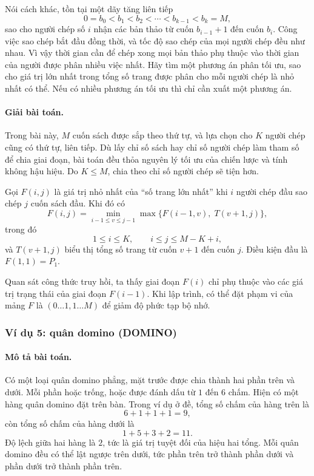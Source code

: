 \documentclass[11pt]{article}
\begin{document}
Nói cách khác, tồn tại một dãy tăng liên tiếp
\[
  0=b_0<b_1<b_2<\cdots<b_{k-1}<b_k=M,
\]
sao cho người chép số $i$ nhận các bản thảo từ cuốn $b_{i-1}+1$ đến cuốn
$b_i$. Công việc sao chép bắt đầu đồng thời, và tốc độ sao chép của mọi người
chép đều như nhau. Vì vậy thời gian cần để chép xong mọi bản thảo phụ thuộc
vào thời gian của người được phân nhiều việc nhất. Hãy tìm một phương án phân
tối ưu, sao cho giá trị lớn nhất trong tổng số trang được phân cho mỗi người
chép là nhỏ nhất có thể. Nếu có nhiều phương án tối ưu thì chỉ cần xuất một
phương án.

\paragraph{Giải bài toán.}
Trong bài này, $M$ cuốn sách được sắp theo thứ tự, và lựa chọn cho $K$ người
chép cũng có thứ tự, liên tiếp. Dù lấy chỉ số sách hay chỉ số người chép làm
tham số để chia giai đoạn, bài toán đều thỏa nguyên lý tối ưu của chiến lược
và tính không hậu hiệu. Do $K\le M$, chia theo chỉ số người chép sẽ tiện hơn.

Gọi $F(i,j)$ là giá trị nhỏ nhất của ``số trang lớn nhất'' khi $i$ người chép
đầu sao chép $j$ cuốn sách đầu. Khi đó có
\[
  F(i,j)=
  \min_{i-1\le v\le j-1}
  \max\{F(i-1,v),\;T(v+1,j)\},
\]
trong đó
\[
  1\le i\le K,\qquad i\le j\le M-K+i,
\]
và $T(v+1,j)$ biểu thị tổng số trang từ cuốn $v+1$ đến cuốn $j$. Điều kiện
đầu là $F(1,1)=P_1$.

Quan sát công thức truy hồi, ta thấy giai đoạn $F(i)$ chỉ phụ thuộc vào các
giá trị trạng thái của giai đoạn $F(i-1)$. Khi lập trình, có thể đặt phạm vi
của mảng $F$ là $(0\ldots1,1\ldots M)$ để giảm độ phức tạp bộ nhớ.

\subsubsection*{Ví dụ 5: quân domino (DOMINO)}

\paragraph{Mô tả bài toán.}
Có một loại quân domino phẳng, mặt trước được chia thành hai phần trên và
dưới. Mỗi phần hoặc trống, hoặc được đánh dấu từ $1$ đến $6$ chấm. Hiện có
một hàng quân domino đặt trên bàn. Trong ví dụ ở đề, tổng số chấm của hàng
trên là
\[
  6+1+1+1=9,
\]
còn tổng số chấm của hàng dưới là
\[
  1+5+3+2=11.
\]
Độ lệch giữa hai hàng là $2$, tức là giá trị tuyệt đối của hiệu hai tổng. Mỗi
quân domino đều có thể lật ngược trên dưới, tức phần trên trở thành phần dưới
và phần dưới trở thành phần trên.
\end{document}

